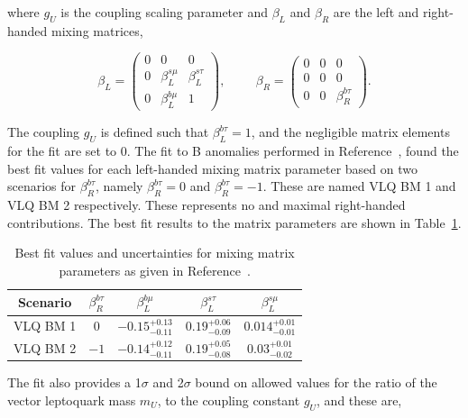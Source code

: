 where $g_{U}$ is the coupling scaling parameter and $\beta_{L}$ and $\beta_{R}$ are the left and right-handed mixing matrices,

\begin{equation}
\beta_{L} = 
\begin{pmatrix}
0 & 0 & 0 \\
0 & \beta_{L}^{s\mu} & \beta_{L}^{s\tau} \\
0 & \beta_{L}^{b\mu} & 1
\end{pmatrix},
\hspace{1cm}
\beta_{R} = 
\begin{pmatrix}
0 & 0 & 0 \\
0 & 0 & 0 \\
0 & 0 & \beta_{R}^{b\tau}
\end{pmatrix}.
\end{equation}

The coupling $g_{U}$ is defined such that $\beta_{L}^{b\tau}=1$, and the negligible matrix elements for the fit are set to 0.
The fit to B anomalies performed in Reference~\cite{Cornella:2021sby}, found the best fit values for each left-handed mixing matrix parameter based on two scenarios for $\beta^{b\tau}_{R}$, namely $\beta^{b\tau}_{R} = 0$ and $\beta^{b\tau}_{R} = -1$.
These are named VLQ BM 1 and VLQ BM 2 respectively.
These represents no and maximal right-handed contributions. 
The best fit results to the matrix parameters are shown in Table~\ref{tab:vlq_bestfit}.

\begin{table}[h]
\centering
\begin{tabular}{|c|c||c|c|c|}
\hline
Scenario & $\beta^{b\tau}_{R}$ & $\beta^{b\mu}_{L}$ & $\beta^{s\tau}_{L}$ & $\beta^{s\mu}_{L}$ \\
\hline
\hline
VLQ BM 1 & $0$ & $-0.15^{+0.13}_{-0.11}$ & $0.19^{+0.06}_{-0.09}$ & $0.014^{+0.01}_{-0.01}$ \\
VLQ BM 2 & $-1$ & $-0.14^{+0.12}_{-0.11}$ & $0.19^{+0.05}_{-0.08}$ & $0.03^{+0.01}_{-0.02}$ \\
\hline
\end{tabular}
\caption{Best fit values and uncertainties for mixing matrix parameters as given in Reference~\cite{Cornella:2021sby}.}
\label{tab:vlq_bestfit}
\end{table}

The fit also provides a 1$\sigma$ and 2$\sigma$ bound on allowed values for the ratio of the vector leptoquark mass $m_{U}$, to the coupling constant $g_{U}$, and these are,

